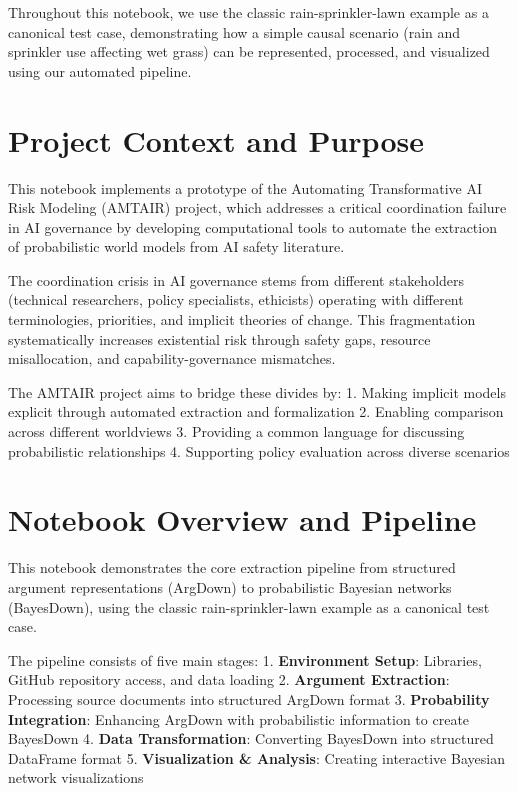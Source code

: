 \documentclass[
  11pt,
  letterpaper,
]{book}
\begin{document}
Throughout this notebook, we use the classic rain-sprinkler-lawn example
as a canonical test case, demonstrating how a simple causal scenario
(rain and sprinkler use affecting wet grass) can be represented,
processed, and visualized using our automated pipeline.

\section{Project Context and Purpose}\label{project-context-and-purpose}

This notebook implements a prototype of the Automating Transformative AI
Risk Modeling (AMTAIR) project, which addresses a critical coordination
failure in AI governance by developing computational tools to automate
the extraction of probabilistic world models from AI safety literature.

The coordination crisis in AI governance stems from different
stakeholders (technical researchers, policy specialists, ethicists)
operating with different terminologies, priorities, and implicit
theories of change. This fragmentation systematically increases
existential risk through safety gaps, resource misallocation, and
capability-governance mismatches.

The AMTAIR project aims to bridge these divides by: 1. Making implicit
models explicit through automated extraction and formalization 2.
Enabling comparison across different worldviews 3. Providing a common
language for discussing probabilistic relationships 4. Supporting policy
evaluation across diverse scenarios

\section{Notebook Overview and
Pipeline}\label{notebook-overview-and-pipeline}

This notebook demonstrates the core extraction pipeline from structured
argument representations (ArgDown) to probabilistic Bayesian networks
(BayesDown), using the classic rain-sprinkler-lawn example as a
canonical test case.

The pipeline consists of five main stages: 1. \textbf{Environment
Setup}: Libraries, GitHub repository access, and data loading 2.
\textbf{Argument Extraction}: Processing source documents into
structured ArgDown format 3. \textbf{Probability Integration}: Enhancing
ArgDown with probabilistic information to create BayesDown 4.
\textbf{Data Transformation}: Converting BayesDown into structured
DataFrame format 5. \textbf{Visualization \& Analysis}: Creating
interactive Bayesian network visualizations
\end{document}
